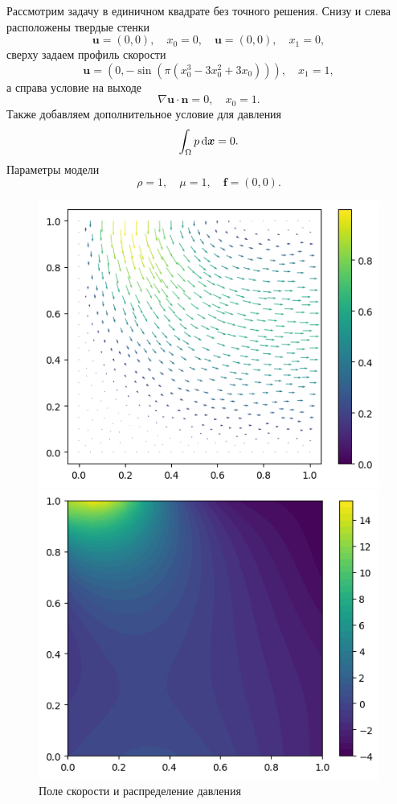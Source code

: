 \documentclass[a4paper,10pt]{report}
\begin{document}
Рассмотрим задачу в единичном квадрате без точного решения. Снизу и слева расположены твердые стенки
\[
    \bm{u} = (0, 0), \quad x_0 = 0, \quad \bm{u} = (0, 0), \quad x_1 = 0,
\]
сверху задаем профиль скорости
\[
    \bm{u} = \left(0, -\sin(\pi (x_0^3 - 3 x_0^2 + 3 x_0))\right), \quad x_1 = 1,
\]
а справа условие на выходе
\[
    \nabla \bm{u} \cdot \bm{n} = 0, \quad x_0 = 1.
\]
Также добавляем дополнительное условие для давления
\[
    \int_\Omega p \,{\rm d}\bm{x} = 0.
\]
Параметры модели 
\[
    \rho=1, \quad \mu = 1, \quad \bm{f}=(0, 0).
\]

\begin{figure}[H]
    \begin{minipage}{0.49\linewidth}
        \includegraphics[height=0.75\linewidth]{kanflow/u.png}
    \end{minipage}
    \begin{minipage}{0.49\linewidth}
        \includegraphics[height=0.75\linewidth]{kanflow/p.png}
    \end{minipage}
    \label{fig:kanflow}
    \caption{Поле скорости и распределение давления}
\end{figure}
    
\end{document}
